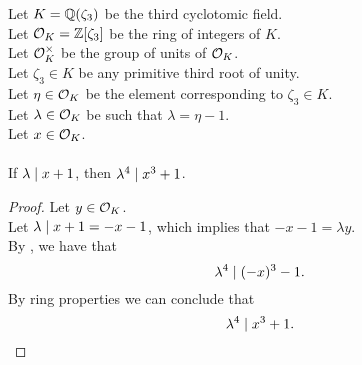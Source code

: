 \begin{lemma}
    \label{lmm:lambda_pow_four_dvd_cube_add_one_of_dvd_add_one}
    \leanok
    Let $K = \mathbb{Q}(\zeta_3)$ be the third cyclotomic field. \\
    Let $\mathcal{O}_K = \mathbb{Z}[\zeta_3]$ be the ring of integers of $K$. \\
    Let $\mathcal{O}^\times_K$ be the group of units of $\mathcal{O}_K$. \\
    Let $\zeta_3 \in K$ be any primitive third root of unity. \\
    Let $\eta \in \mathcal{O}_K$ be the element corresponding to $\zeta_3 \in K$. \\
    Let $\lambda \in \mathcal{O}_K$ be such that $\lambda = \eta -1$. \\
    Let $x \in \mathcal{O}_K$. \\\\
    If $\lambda \mid x + 1$, then $\lambda^4 \mid x ^ 3 + 1$.
\end{lemma}
\begin{proof}
    \leanok
    Let $y\in \mathcal{O}_K$. \\
    Let $\lambda \mid x + 1 = - x - 1$, which implies that $- x - 1 = \lambda y$. \\
    By , we have that
    $$\lambda^ 4 \mid (-x)^3 - 1.$$
    By ring properties we can conclude that $$\lambda^ 4 \mid x^3 + 1.$$
\end{proof}

